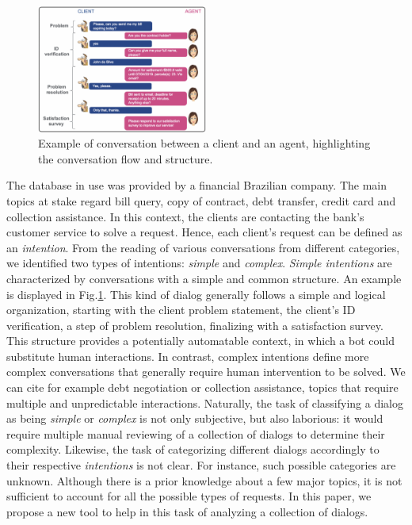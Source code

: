 \documentclass[11pt,a4paper]{article}
\begin{document}
\begin{figure}
    \centering
    \includegraphics[width=0.5\textwidth]{figures/dialogue_description.png}
    \caption{Example of conversation between a client and an agent, highlighting the conversation flow and structure.}
    \label{fig:dialog_description}
\end{figure}

The database in use was provided by a financial Brazilian company. The main topics at stake regard bill query, copy of contract, debt transfer, credit card and collection assistance. In this context, the clients are contacting the bank’s customer service to solve a request. Hence, each client’s request can be defined as an \textit{intention}. From the reading of various conversations from different categories, we identified two types of intentions: \textit{simple} and \textit{complex}. \textit{Simple intentions} are characterized by conversations with a simple and common structure. An example is displayed in Fig.\ref{fig:dialog_description}. This kind of dialog generally follows a simple and logical organization, starting with the client problem statement, the client’s ID verification, a step of problem resolution, finalizing with a satisfaction survey. This structure provides a potentially automatable context, in which a bot could substitute human interactions. In contrast, complex intentions define more complex conversations that generally require human intervention to be solved. We can cite for example debt negotiation or collection assistance, topics that require multiple and unpredictable interactions. Naturally, the task of classifying a dialog as being \textit{simple} or \textit{complex} is not only subjective, but also laborious: it would require multiple manual reviewing of a collection of dialogs to determine their complexity. Likewise, the task of categorizing different dialogs accordingly to their respective \textit{intentions} is not clear. For instance, such possible categories are unknown. Although there is a prior knowledge about a few major topics, it is not sufficient to account for all the possible types of requests. 
In this paper, we propose a new tool to help in this task of analyzing a collection of dialogs.
\end{document}
